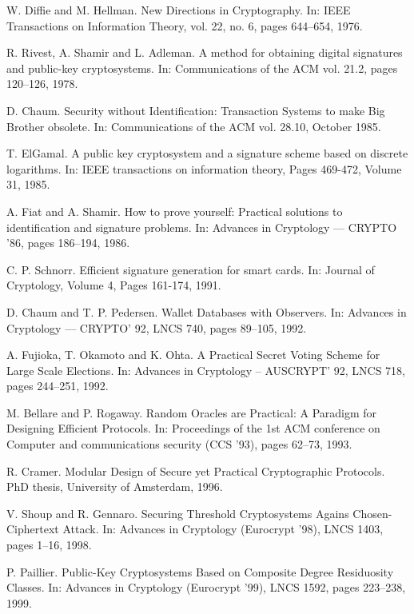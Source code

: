 \documentclass[envcountsame]{llncs}
\begin{document}
\begin{thebibliography}{XXX11}



W. Diffie and M. Hellman.
New Directions in Cryptography.
In: IEEE Transactions on Information Theory, vol. 22, no. 6, pages 644--654, 1976.

R. Rivest, A. Shamir and L. Adleman.
A method for obtaining digital signatures and public-key cryptosystems.
In: Communications of the ACM vol. 21.2, pages 120--126, 1978.

D. Chaum.
Security without Identification: Transaction Systems to make Big Brother obsolete.
In: Communications of the ACM vol. 28.10, October 1985.

T. ElGamal.
A public key cryptosystem and a signature scheme based on discrete logarithms.
In: IEEE transactions on information theory, Pages 469-472, Volume 31, 1985.

A. Fiat and A. Shamir.
How to prove yourself: Practical solutions to identification and signature problems.
In: Advances in Cryptology --- CRYPTO '86, pages 186--194, 1986.

C. P. Schnorr.
Efficient signature generation for smart cards.
In: Journal of Cryptology, Volume 4, Pages 161-174, 1991.

D. Chaum and T. P. Pedersen.
Wallet Databases with Observers.
In: Advances in Cryptology --- CRYPTO' 92, LNCS 740, pages 89--105, 1992.

A. Fujioka, T. Okamoto and K. Ohta.
A Practical Secret Voting Scheme for Large Scale Elections.
In: Advances in Cryptology -- AUSCRYPT' 92, LNCS 718, pages 244--251, 1992.

M. Bellare and P. Rogaway.
Random Oracles are Practical: A Paradigm for Designing Efficient Protocols.
In: Proceedings of the 1st ACM conference on Computer and communications security (CCS '93), pages 62--73, 1993.

R. Cramer.
Modular Design of Secure yet Practical Cryptographic Protocols.
PhD thesis, University of Amsterdam, 1996.

V. Shoup and R. Gennaro.
Securing Threshold Cryptosystems Agains Chosen-Ciphertext Attack.
In: Advances in Cryptology (Eurocrypt '98), LNCS 1403, pages 1--16, 1998.

P. Paillier.
Public-Key Cryptosystems Based on Composite Degree Residuosity Classes.
In: Advances in Cryptology (Eurocrypt '99), LNCS 1592, pages
223--238, 1999.


\end{thebibliography}
\end{document}
